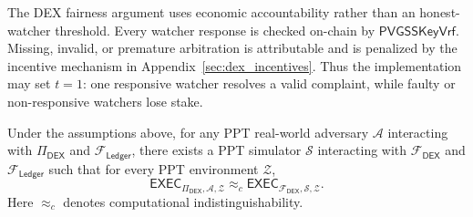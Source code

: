 \documentclass[runningheads]{llncs}
\newcommand{\pvgssKeyVrf}{\mathsf{PVGSSKeyVrf}}
\begin{document}
The DEX fairness argument uses economic accountability rather than an
honest-watcher threshold. Every watcher response is checked on-chain by
\(\pvgssKeyVrf\). Missing, invalid, or premature arbitration is attributable and
is penalized by the incentive mechanism in Appendix~\ref{sec:dex_incentives}.
Thus the implementation may set \(t=1\): one responsive watcher resolves a valid
complaint, while faulty or non-responsive watchers lose stake.

\begin{theorem}
\label{thm:uc-dex}
Under the assumptions above, for any PPT real-world adversary \(\mathcal{A}\)
interacting with \(\Pi_{\mathsf{DEX}}\) and \(\mathcal{F}_{\mathsf{Ledger}}\),
there exists a PPT simulator \(\mathcal{S}\) interacting with
\(\mathcal{F}_{\mathsf{DEX}}\) and \(\mathcal{F}_{\mathsf{Ledger}}\) such that
for every PPT environment \(\mathcal{Z}\),
\[
    \mathsf{EXEC}_{\Pi_{\mathsf{DEX}}, \mathcal{A}, \mathcal{Z}}
    \approx_c
    \mathsf{EXEC}_{\mathcal{F}_{\mathsf{DEX}}, \mathcal{S}, \mathcal{Z}} .
\]
Here \(\approx_c\) denotes computational indistinguishability.
\end{theorem}
\end{document}
